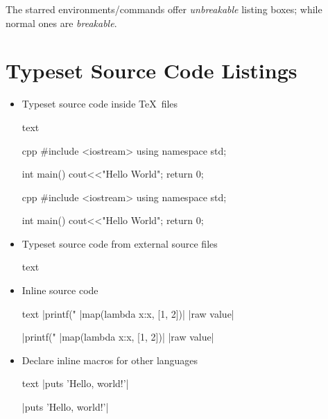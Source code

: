 \documentclass[letterpaper, 11pt, DIV=11]{scrartcl}
\begin{document}
The starred environments/commands offer \emph{unbreakable} listing boxes; while normal ones are \emph{breakable}.



\section{Typeset Source Code Listings}

\begin{itemize}

\item Typeset source code inside \TeX\ files

\begin{tcbsrccode}{text}
\begin{tcbcode}{cpp}
#include <iostream>  
using namespace std; 

int main(){ 
    cout<<"Hello World\n"; 
    return 0; 
} 
\end{tcbcode}
\end{tcbsrccode}
\begin{tcbcode}{cpp}
#include <iostream>  
using namespace std; 

int main(){ 
    cout<<"Hello World\n"; 
    return 0; 
} 
\end{tcbcode}


\item Typeset source code from external source files

\begin{tcbsrccode}{text}
\end{tcbsrccode}

\item Inline source code

\begin{tcbsrccode}{text}
\cinline|printf("%
\pyinline|map(lambda x:x, [1, 2])|
\rawinline|raw value|
\end{tcbsrccode}
\cinline|printf("%
\pyinline|map(lambda x:x, [1, 2])|
\rawinline|raw value|

\item Declare inline macros for other languages

\begin{tcbsrccode}{text}
\rubyinline|puts 'Hello, world!'|
\end{tcbsrccode}
\rubyinline|puts 'Hello, world!'|

\end{itemize}
\end{document}
